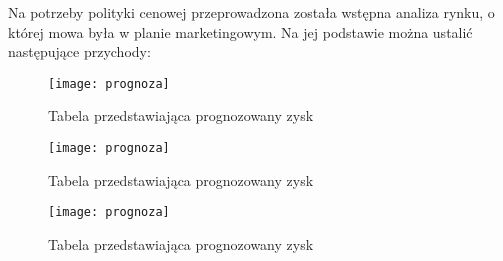 
	\par Na potrzeby polityki cenowej przeprowadzona została wstępna analiza rynku, o której mowa była w planie marketingowym. Na jej podstawie można ustalić następujące przychody: 
	
	
	\begin{figure}[H]
        \centering
        \texttt{[image: prognoza]}
        \caption{Tabela przedstawiająca prognozowany zysk}
	\end{figure}
	
	\begin{figure}[H]
        \centering        
        \texttt{[image: prognoza]}
        \caption{Tabela przedstawiająca prognozowany zysk}
	\end{figure}
	
	\begin{figure}[H]
        \centering        
        \texttt{[image: prognoza]}
        \caption{Tabela przedstawiająca prognozowany zysk}
	\end{figure}
	
